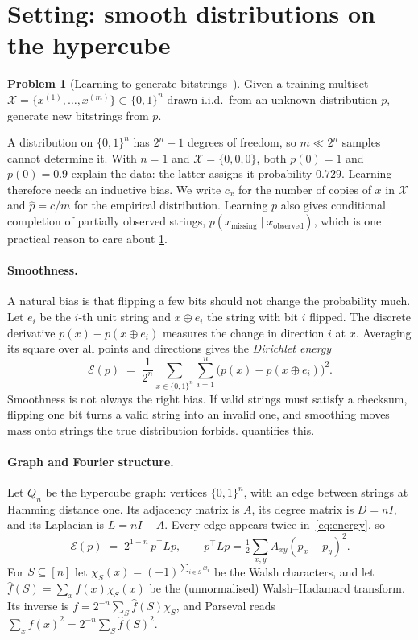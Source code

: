 \documentclass[11pt]{article}
\theoremstyle{definition}
\newtheorem{problem}{Problem}
\theoremstyle{remark}
\newcommand{\B}{\{0,1\}^n}
\newcommand{\E}{\mathcal{E}}
\newcommand{\X}{\mathcal{X}}
\newcommand{\hp}{\hat p}
\newcommand{\wh}[1]{\widehat{#1}}
\begin{document}
\section{Setting: smooth distributions on the hypercube}
\label{sec:setting}

\begin{problem}[Learning to generate bitstrings~\cite{belis2026spectral}]\label{prob:gen}
Given a training multiset $\X=\{x^{(1)},\dots,x^{(m)}\}\subset\B$ drawn i.i.d.\ from an unknown distribution $p$, generate new bitstrings from $p$.
\end{problem}

A distribution on $\B$ has $2^n-1$ degrees of freedom, so $m\ll 2^n$ samples cannot determine it. With $n=1$ and $\X=\{0,0,0\}$, both $p(0)=1$ and $p(0)=0.9$ explain the data: the latter assigns it probability $0.729$. Learning therefore needs an inductive bias. We write $c_x$ for the number of copies of $x$ in $\X$ and $\hp=c/m$ for the empirical distribution. Learning $p$ also gives conditional completion of partially observed strings, $p(x_{\text{missing}}\mid x_{\text{observed}})$, which is one practical reason to care about \cref{prob:gen}.

\paragraph{Smoothness.}
A natural bias is that flipping a few bits should not change the probability much. Let $e_i$ be the $i$-th unit string and $x\oplus e_i$ the string with bit $i$ flipped. The discrete derivative $p(x)-p(x\oplus e_i)$ measures the change in direction $i$ at $x$. Averaging its square over all points and directions gives the \emph{Dirichlet energy}
\begin{equation}\label{eq:energy}
\E(p) \;=\; \frac{1}{2^n}\sum_{x\in\B}\sum_{i=1}^n \bigl(p(x)-p(x\oplus e_i)\bigr)^2 .
\end{equation}
Smoothness is not always the right bias. If valid strings must satisfy a checksum, flipping one bit turns a valid string into an invalid one, and smoothing moves mass onto strings the true distribution forbids.  quantifies this.

\paragraph{Graph and Fourier structure.}
Let $Q_n$ be the hypercube graph: vertices $\B$, with an edge between strings at Hamming distance one. Its adjacency matrix is $A$, its degree matrix is $D=nI$, and its Laplacian is $L=nI-A$. Every edge appears twice in~\eqref{eq:energy}, so
\begin{equation}\label{eq:energy-laplacian}
\E(p) \;=\; 2^{1-n}\, p^\top L p ,\qquad
p^\top L p=\tfrac12\textstyle\sum_{x,y}A_{xy}(p_x-p_y)^2 .
\end{equation}
For $S\subseteq[n]$ let $\chi_S(x)=(-1)^{\sum_{i\in S}x_i}$ be the Walsh characters, and let $\wh f(S)=\sum_x f(x)\chi_S(x)$ be the (unnormalised) Walsh--Hadamard transform. Its inverse is $f=2^{-n}\sum_S \wh f(S)\chi_S$, and Parseval reads $\sum_x f(x)^2=2^{-n}\sum_S\wh f(S)^2$.
\end{document}
